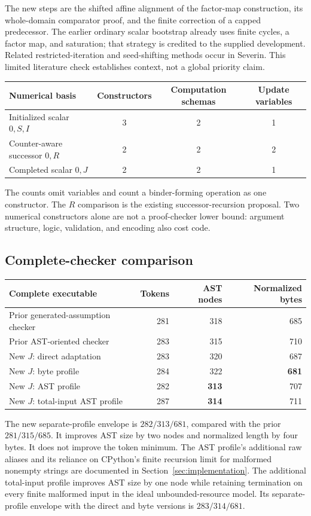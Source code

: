 \documentclass[11pt,letterpaper]{article}
\theoremstyle{definition}\newtheorem{definition}[theorem]{Definition}
\theoremstyle{remark}\newtheorem{remark}[theorem]{Remark}
\begin{document}
The new steps are the shifted affine alignment of the factor-map
construction, its whole-domain comparator proof, and the finite correction
of a capped predecessor. The earlier ordinary scalar bootstrap already
uses finite cycles, a factor map, and saturation; that strategy is credited
to the supplied development\cite{generated}. Related restricted-iteration
and seed-shifting methods occur in Severin\cite{severin}. This limited
literature check establishes context, not a global priority claim.

\begin{center}
\begin{tabular}{lccc}
\toprule
Numerical basis & Constructors & Computation schemas & Update variables\\
\midrule
Initialized scalar $0,S,I$ & 3 & 2 & 1\\
Counter-aware successor $0,R$ & 2 & 2 & 2\\
Completed scalar $0,J$ & 2 & 2 & 1\\
\bottomrule
\end{tabular}
\end{center}
The counts omit variables and count a binder-forming operation as one
constructor. The $R$ comparison is the existing successor-recursion
proposal\cite{successor}. Two numerical constructors alone are not a
proof-checker lower bound: argument structure, logic, validation, and
encoding also cost code.

\subsection{Complete-checker comparison}
\begin{center}
\begin{tabular}{lrrr}
\toprule
Complete executable & Tokens & AST nodes & Normalized bytes\\
\midrule
Prior generated-assumption checker & 281 & 318 & 685\\
Prior AST-oriented checker & 283 & 315 & 710\\
New $J$: direct adaptation & 283 & 320 & 687\\
New $J$: byte profile & 284 & 322 & \textbf{681}\\
New $J$: AST profile & 282 & \textbf{313} & 707\\
New $J$: total-input AST profile & 287 & \textbf{314} & 711\\
\bottomrule
\end{tabular}
\end{center}
The new separate-profile envelope is $282/313/681$, compared with the
prior $281/315/685$. It improves AST size by two nodes and normalized
length by four bytes. It does not improve the token minimum. The AST
profile's additional raw aliases and its reliance on CPython's finite
recursion limit for malformed nonempty strings are documented in
Section~\ref{sec:implementation}.
The additional total-input profile improves AST size by one node while
retaining termination on every finite malformed input in the ideal
unbounded-resource model. Its separate-profile envelope with the direct
and byte versions is $283/314/681$.
\end{document}
